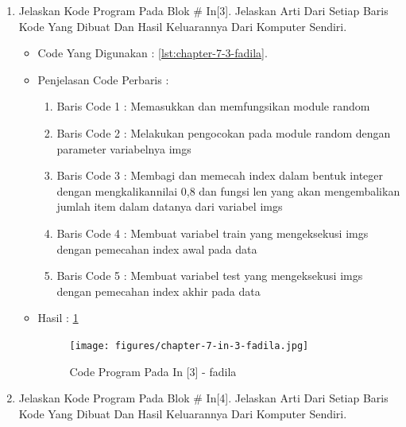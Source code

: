 \begin{enumerate}
\par
\par
\par
\item Jelaskan Kode Program Pada Blok \# In[3]. Jelaskan Arti Dari Setiap Baris Kode Yang Dibuat Dan Hasil Keluarannya Dari Komputer Sendiri.
\begin{itemize}
\item Code Yang Digunakan : \ref{lst:chapter-7-3-fadila}.

\par
\par
\item Penjelasan Code Perbaris	: 
\begin{enumerate}
\item Baris Code 1	: Memasukkan dan memfungsikan module random
\item Baris Code 2	: Melakukan pengocokan pada module random dengan parameter variabelnya imgs
\item Baris Code 3	: Membagi dan memecah index dalam bentuk integer dengan mengkalikannilai 0,8 dan fungsi len yang akan mengembalikan jumlah item dalam datanya dari variabel imgs
\item Baris Code 4	: Membuat variabel train yang mengeksekusi imgs dengan pemecahan index awal pada data
\item Baris Code 5	: Membuat variabel test yang mengeksekusi imgs dengan pemecahan index akhir pada data
\end{enumerate}
\par
\item Hasil : \ref{chapter-7-in-3-fadila}
\par
\par
\begin{figure}[!hbtp]
\centering
\texttt{[image: figures/chapter-7-in-3-fadila.jpg]}
\caption{Code Program Pada In [3] - fadila}
\label{chapter-7-in-3-fadila}
\end{figure}
\par
\par
\end{itemize}
\par
\par
\par
\item Jelaskan Kode Program Pada Blok \# In[4]. Jelaskan Arti Dari Setiap Baris Kode Yang Dibuat Dan Hasil Keluarannya Dari Komputer Sendiri.
\begin{itemize}

\end{itemize}
\end{enumerate}
